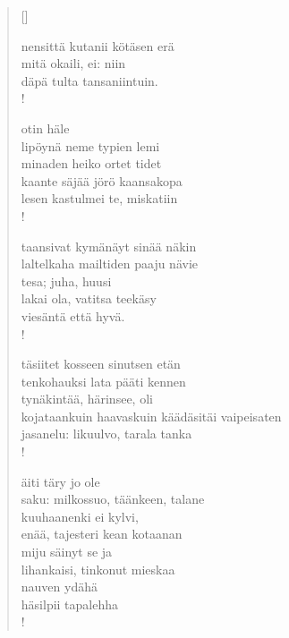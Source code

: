 \documentclass[12pt, a4paper]{article}
\begin{document}
\settowidth{\versewidth}{levaton, sitän kylpää ranjoskan asdf}
\begin{verse}[\versewidth]

nensittä kutanii kötäsen erä \\
mitä okaili, ei: niin \\
däpä tulta tansaniintuin. \\!



otin häle \\
lipöynä neme typien lemi \\
minaden heiko ortet tidet \\
kaante säjää jörö kaansakopa \\
lesen kastulmei te, miskatiin \\!



taansivat kymänäyt sinää näkin \\
laltelkaha mailtiden paaju nävie \\
tesa; juha, huusi \\
lakai ola, vatitsa teekäsy \\
viesäntä että hyvä. \\!



täsiitet kosseen sinutsen etän \\
tenkohauksi lata pääti kennen \\
tynäkintää, härinsee, oli \\
kojataankuin haavaskuin käädäsitäi vaipeisaten \\
jasanelu: likuulvo, tarala tanka \\!



äiti täry jo ole \\
saku: milkossuo, täänkeen, talane \\
kuuhaanenki ei kylvi, \\
enää, tajesteri kean kotaanan \\
miju säinyt se ja \\
lihankaisi, tinkonut mieskaa \\
nauven ydähä \\
häsilpii tapalehha \\!


\end{verse}
\newpage
\end{document}
